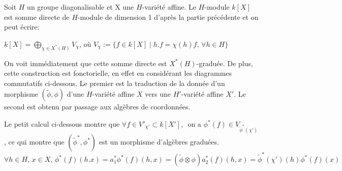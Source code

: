 \begin{cons}
Soit $H$ un groupe diagonalisable et X une $H$-variété affine. Le $H$-module $k[X]$ est somme directe de $H$-module de dimension 1 d'après la partie précédente et on peut écrire: 
\begin{center}
$k[X]=\bigoplus_{\chi \in X^*(H)}V_\chi$,  où $V_\chi:=\lbrace f\in k[X]\mid h.f=\chi(h)f,\, \forall h\in H \rbrace$ 
\end{center}
On voit immédiatement que cette somme directe est $X^*(H)$-graduée. De plus, cette construction est fonctorielle, en effet en considérant les diagrammes commutatifs ci-dessous. Le premier est la traduction de la donnée d'un morphisme $(\widetilde{\phi},\phi)$ d'une $H$-variété affine $X$ vers une $H'$-variété affine $X'$. Le second est obtenu par passage aux algèbres de coordonnées.
\begin{multicols}{2}
	\begin{center}
	\end{center}

	\columnbreak
	\begin{center}
	\end{center}
\end{multicols}
Le petit calcul ci-dessous montre que $\forall f\in V'_{\chi'}\subset k[X'],\,$ on a $\phi^*(f)\in V_{\widetilde{\phi}^*(\chi')}$, ce qui montre que $(\widetilde{\phi}^*,\phi^*)$ est un morphisme d'algèbres graduées. 
$$\forall h\in H,\,x\in X,\, \phi^*(f)(h.x)=a_1^*\phi^*(f)(h, x)=(\widetilde{\phi}\otimes\phi)a_2^*(f)(h,x)=\widetilde{\phi}^*(\chi')(h)\phi^*(f)(x)$$ 

\end{cons}

